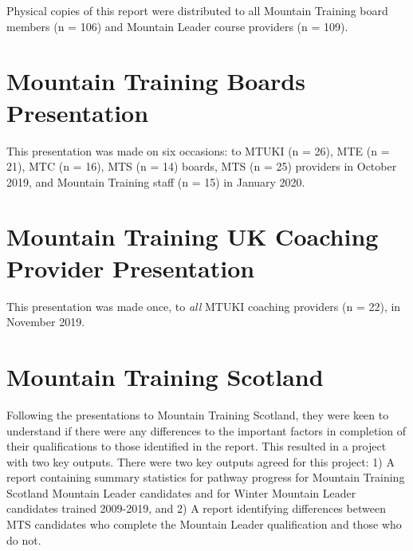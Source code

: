 \documentclass[
  12pt,
  a4paper,
]{book}
\begin{document}
Physical copies of this report were distributed to all Mountain Training board members (n = 106) and Mountain Leader course providers (n = 109).



\hypertarget{impact-board-pres}{%
\section{Mountain Training Boards Presentation}\label{impact-board-pres}}

This presentation was made on six occasions: to MTUKI (n = 26), MTE (n = 21), MTC (n = 16), MTS (n = 14) boards, MTS (n = 25) providers in October 2019, and Mountain Training staff (n = 15) in January 2020.



\hypertarget{impact-coach-pres}{%
\section{Mountain Training UK Coaching Provider Presentation}\label{impact-coach-pres}}

This presentation was made once, to \emph{all} MTUKI coaching providers (n = 22), in November 2019.



\hypertarget{impact-mts}{%
\section{Mountain Training Scotland}\label{impact-mts}}

Following the presentations to Mountain Training Scotland, they were keen to understand if there were any differences to the important factors in completion of their qualifications to those identified in the report. This resulted in a project with two key outputs. There were two key outputs agreed for this project: 1) A report containing summary statistics for pathway progress for Mountain Training Scotland Mountain Leader candidates and for Winter Mountain Leader candidates trained 2009-2019, and 2) A report identifying differences between MTS candidates who complete the Mountain Leader qualification and those who do not.
\end{document}
